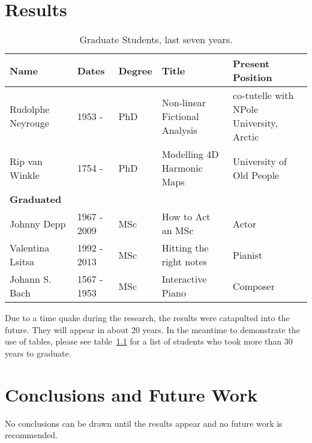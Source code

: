 \documentclass[11pt]{report}
\begin{document}
\chapter{Results}
\begin{table}[tbp]
\begin{tabular}{||l|l|l|p{1.5in}|p{1.2in}||}
\hline
\hline
Name & Dates & Degree & Title & Present Position \\
\hline
Rudolphe Neyrouge & 1953  - & PhD &  Non-linear Fictional Analysis &  co-tutelle with NPole University, Arctic \\
Rip van Winkle & 1754 -  & PhD & Modelling 4D Harmonic Maps & University of Old People \\

\hline
{\bf Graduated} &&&& \\
\hline
Johnny Depp & 1967 - 2009 & MSc & How to Act an MSc & Actor \\
Valentina Lsitsa & 1992 - 2013 & MSc & Hitting the right notes &  Pianist  \\
Johann S. Bach & 1567 - 1953 & MSc & Interactive Piano  & Composer \\\hline
\hline
\end{tabular}
\caption{\label{stud-table} Graduate Students, last seven years.}
\end{table}

Due to a time quake during the research, the results were catapulted into the future.  They will appear in about 20 years.
In the meantime to demonstrate the use of tables, please see table~\ref{stud-table} for a list of students who took more than 30 years to graduate.

\chapter{Conclusions and Future Work}
No conclusions can be drawn until the results appear and no future work is recommended.




\end{document}
